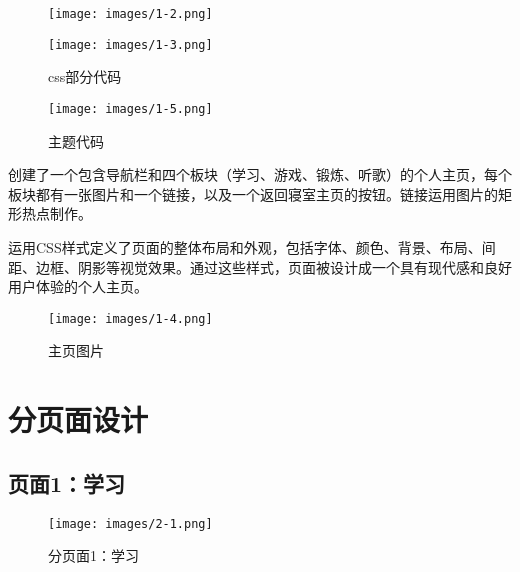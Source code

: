 \documentclass[supercite]{Experimental_Report}
\theoremstyle{definition}
\begin{document}
\begin{figure}[htb]
	\begin{center}
		\texttt{[image: images/1-2.png]}
		\label{fig1-2}
	\end{center}
\end{figure}
\newpage
\begin{figure}[htb]
	\begin{center}
		\texttt{[image: images/1-3.png]}
		\caption{css部分代码}
		\label{fig1-3}
	\end{center}
\end{figure}
\begin{figure}[htb]
	\begin{center}
		\texttt{[image: images/1-5.png]}
		\caption{主题代码}
		\label{fig1-5}
	\end{center}
\end{figure}
\newpage
创建了一个包含导航栏和四个板块（学习、游戏、锻炼、听歌）的个人主页，每个板块都有一张图片和一个链接，以及一个返回寝室主页的按钮。链接运用图片的矩形热点制作。

运用CSS样式定义了页面的整体布局和外观，包括字体、颜色、背景、布局、间距、边框、阴影等视觉效果。通过这些样式，页面被设计成一个具有现代感和良好用户体验的个人主页。
\begin{figure}[htb]
	\begin{center}
		\texttt{[image: images/1-4.png]}
		\caption{主页图片}
		\label{fig1-4}
	\end{center}
\end{figure}




\newpage

\section{分页面设计}


\subsection{页面1：学习 }

\begin{figure}[htb]
	\begin{center}
		\texttt{[image: images/2-1.png]}
		\caption{分页面1：学习}
		\label{fig2-1}
	\end{center}
\end{figure}
\end{document}
